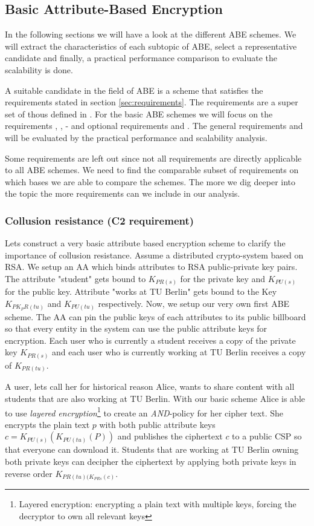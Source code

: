 \subsection{Basic Attribute-Based Encryption}
In the following sections we will have a look at the different ABE schemes. We will extract the  characteristics of each subtopic of ABE, select a representative candidate and finally, a practical performance comparison to evaluate the scalability is done. 

A suitable candidate in the field of ABE is a scheme that satisfies the requirements stated in section \ref{sec:requirements}. The requirements are a super set of thous defined in \cite{lee2013survey}. For the basic \ac{ABE} schemes we will focus on the requirements , ,  -  and optional requirements  and .
The general requirements  and  will be evaluated by the practical performance and scalability analysis.

Some requirements are left out since not all requirements are directly applicable to all ABE schemes. We need to find the comparable subset of requirements on which bases we are able to compare the schemes. The more we dig deeper into the topic the more requirements can we include in our analysis. 

\subsubsection{Collusion resistance (C2 requirement)}
Lets construct a very basic attribute based encryption scheme to clarify the importance of collusion resistance. Assume a distributed crypto-system based on \ac{RSA}. We setup an \ac{AA} which binds attributes to \ac{RSA} public-private key pairs. The attribute "student" gets bound to $K_{PR(s)}$ for the private key and $K_{PU(s)}$ for the public key. Attribute "works at TU Berlin" gets bound to the Key $K_{PK_PR(tu)}$ and $K_{PU(tu)}$ respectively. Now, we setup our very own first ABE scheme. The AA can pin the public keys of each attributes to its public billboard so that every entity in the system can use the public attribute keys for encryption. Each user who is currently a student receives a copy of the private key $K_{PR(s)}$ and each user who is currently working at TU Berlin receives a copy of $K_{PR(tu)}$. 

A user, lets call her for historical reason Alice, wants to share content with all students that are also working at TU Berlin. With our basic scheme Alice is able to use \textit{layered encryption}\footnote{Layered encryption: encrypting a plain text with multiple keys, forcing the decryptor to own all relevant keys} to create an \textit{AND}-policy for her cipher text. She encrypts the plain text $p$ with both public attribute keys $c = K_{PU(s)}(K_{PU(tu)}(P))$ and publishes the ciphertext $c$ to a public CSP so that everyone can download it. Students that are working at TU Berlin owning both private keys can decipher the ciphertext by applying both private keys in reverse order $K_{PR(tu)(K_{PR{s}}(c)}$.

